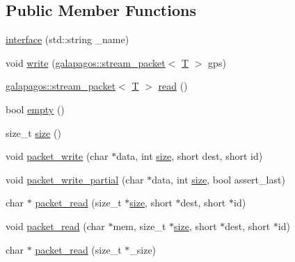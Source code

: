\subsection*{Public Member Functions}
\begin{DoxyCompactItemize}
\item 
\hyperlink{classgalapagos_1_1interface_a63cb49d57ceba5e8c98bba9525799a39}{interface} (std\+::string \+\_\+name)
\item 
void \hyperlink{classgalapagos_1_1interface_a4b3dd138cac79282418844e588e2535b}{write} (\hyperlink{structgalapagos_1_1stream__packet}{galapagos\+::stream\+\_\+packet}$<$ \hyperlink{test_8cpp_a0658ceffa730c765d449bb3d21871b5f}{T} $>$ gps)
\item 
\hyperlink{structgalapagos_1_1stream__packet}{galapagos\+::stream\+\_\+packet}$<$ \hyperlink{test_8cpp_a0658ceffa730c765d449bb3d21871b5f}{T} $>$ \hyperlink{classgalapagos_1_1interface_a5b6366fdfa799f10d782d9f26dccd537}{read} ()
\item 
bool \hyperlink{classgalapagos_1_1interface_af856cabc1eae494cec44f0db63723f90}{empty} ()
\item 
size\+\_\+t \hyperlink{classgalapagos_1_1interface_a385b790d8de8fa2bab099d23dbfe783e}{size} ()
\item 
void \hyperlink{classgalapagos_1_1interface_a1369e3db6102f97c9d34e48de905ecd4}{packet\+\_\+write} (char $\ast$data, int \hyperlink{classgalapagos_1_1interface_a385b790d8de8fa2bab099d23dbfe783e}{size}, short dest, short id)
\item 
void \hyperlink{classgalapagos_1_1interface_a815dfac71a7f639f62dbe0a0d9347624}{packet\+\_\+write\+\_\+partial} (char $\ast$data, int \hyperlink{classgalapagos_1_1interface_a385b790d8de8fa2bab099d23dbfe783e}{size}, bool assert\+\_\+last)
\item 
char $\ast$ \hyperlink{classgalapagos_1_1interface_ad5cc5346287afb304531bcd35667ee4e}{packet\+\_\+read} (size\+\_\+t $\ast$\hyperlink{classgalapagos_1_1interface_a385b790d8de8fa2bab099d23dbfe783e}{size}, short $\ast$dest, short $\ast$id)
\item 
void \hyperlink{classgalapagos_1_1interface_a3e42b3aa2133d0f05c680bfc8fae0195}{packet\+\_\+read} (char $\ast$mem, size\+\_\+t $\ast$\hyperlink{classgalapagos_1_1interface_a385b790d8de8fa2bab099d23dbfe783e}{size}, short $\ast$dest, short $\ast$id)
\item 
char $\ast$ \hyperlink{classgalapagos_1_1interface_a9c87f2c9fe9ed9ee0449dc014e160d16}{packet\+\_\+read} (size\+\_\+t $\ast$\+\_\+size)
\item 

\end{DoxyCompactItemize}
